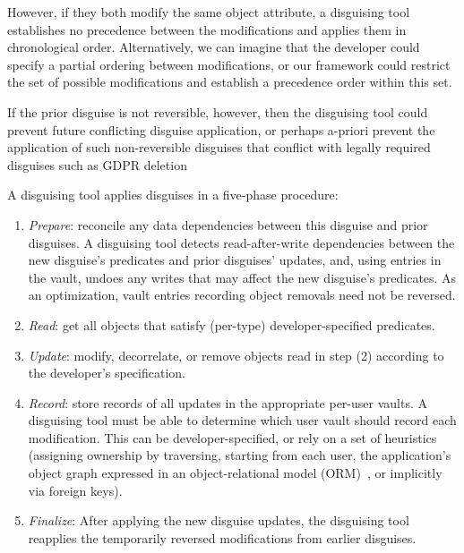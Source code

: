 However, if they both modify the same object attribute, a disguising tool establishes no precedence
between the modifications and applies them in chronological order.  Alternatively, we can imagine
that the developer could specify a partial ordering between modifications, or our framework could
restrict the set of possible modifications and establish a precedence order within this set.

If the prior disguise is not reversible, however, then the disguising tool could prevent future
conflicting disguise application, or perhaps a-priori prevent the application of such non-reversible
disguises that conflict with legally required disguises such as GDPR deletion 


A disguising tool applies disguises in a five-phase procedure:
\begin{enumerate}[nosep]
    \item \emph{Prepare}: reconcile any data dependencies between this disguise and prior disguises.
            A disguising tool detects read-after-write dependencies between the new disguise's predicates and prior disguises'
            updates, and, using entries in the vault, undoes any writes that may affect the new disguise's predicates. As an
            optimization, vault entries recording object removals need not be reversed.
        \item \emph{Read}: get all objects that satisfy (per-type) developer-specified predicates.
        \item \emph{Update}: modify, decorrelate, or remove objects read in step (2) according to the
        developer's specification.
    \item \emph{Record}: store records of all updates in the appropriate per-user vaults. A
        disguising tool
        must be able to determine which user vault should record each modification. This can be
        developer-specified, or rely on a set of heuristics (\eg assigning ownership by traversing,
        starting from each user, the application's object graph expressed in an object-relational
        model (ORM)~\cite{orm}, or implicitly via foreign keys).
        \item \emph{Finalize}: After applying the new disguise updates, the disguising tool reapplies the temporarily reversed modifications from earlier disguises.
\end{enumerate}

